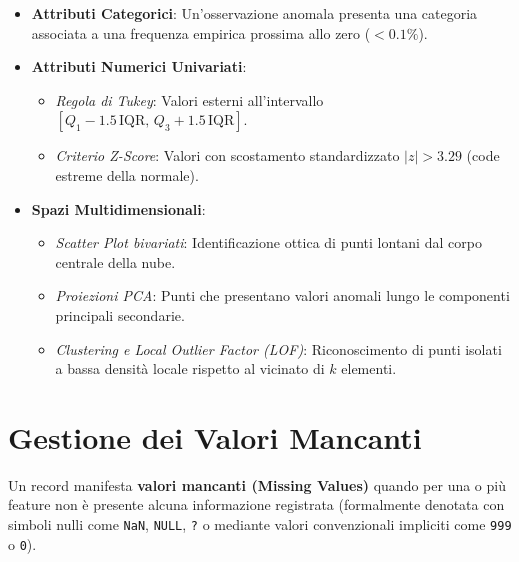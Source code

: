 \begin{itemize}
    \item \textbf{Attributi Categorici}: Un'osservazione anomala presenta una categoria associata a una frequenza empirica prossima allo zero ($< 0.1\%$).
    \item \textbf{Attributi Numerici Univariati}:
    \begin{itemize}[noitemsep]
        \item \textit{Regola di Tukey}: Valori esterni all'intervallo $[Q_1 - 1.5\,\text{IQR},\, Q_3 + 1.5\,\text{IQR}]$.
        \item \textit{Criterio Z-Score}: Valori con scostamento standardizzato $|z| > 3.29$ (code estreme della normale).
    \end{itemize}
    \item \textbf{Spazi Multidimensionali}:
    \begin{itemize}[noitemsep]
        \item \textit{Scatter Plot bivariati}: Identificazione ottica di punti lontani dal corpo centrale della nube.
        \item \textit{Proiezioni PCA}: Punti che presentano valori anomali lungo le componenti principali secondarie.
        \item \textit{Clustering e Local Outlier Factor (LOF)}: Riconoscimento di punti isolati a bassa densità locale rispetto al vicinato di $k$ elementi.
    \end{itemize}
\end{itemize}

\FloatBarrier
\section{Gestione dei Valori Mancanti}
\label{sec:dm-missing-values-intro}

Un record manifesta \textbf{valori mancanti (Missing Values)} quando per una o più feature non è presente alcuna informazione registrata (formalmente denotata con simboli nulli come \texttt{NaN}, \texttt{NULL}, \texttt{?} o mediante valori convenzionali impliciti come \texttt{999} o \texttt{0}).

\FloatBarrier
